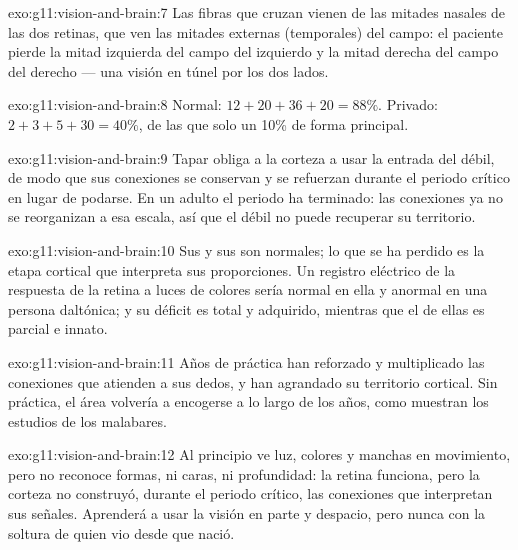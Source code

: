 \begin{solution}{exo:g11:vision-and-brain:7}
Las fibras que cruzan vienen de las mitades nasales de las dos retinas,
que ven las mitades externas (temporales) del campo: el paciente pierde
la mitad izquierda del campo del  izquierdo y la mitad derecha del
campo del  derecho --- una visión en túnel por los dos lados.
\end{solution}

\begin{solution}{exo:g11:vision-and-brain:8}
Normal: $12 + 20 + 36 + 20 = 88\%$. Privado: $2 + 3 + 5 + 30 = 40\%$,
de las que solo un 10\% de forma principal.
\end{solution}

\begin{solution}{exo:g11:vision-and-brain:9}
Tapar obliga a la corteza a usar la entrada del  débil, de modo que
sus conexiones se conservan y se refuerzan durante el periodo crítico
en lugar de podarse. En un adulto el periodo ha terminado: las
conexiones ya no se reorganizan a esa escala, así que el  débil no
puede recuperar su territorio.
\end{solution}

\begin{solution}{exo:g11:vision-and-brain:10}
Sus  y sus  son normales; lo que se ha perdido es la etapa
cortical que interpreta sus proporciones. Un registro eléctrico de la
respuesta de la retina a luces de colores sería normal en ella y
anormal en una persona daltónica; y su déficit es total y adquirido,
mientras que el de ellas es parcial e innato.
\end{solution}

\begin{solution}{exo:g11:vision-and-brain:11}
Años de práctica han reforzado y multiplicado las conexiones que
atienden a sus dedos, y han agrandado su territorio cortical. Sin
práctica, el área volvería a encogerse a lo largo de los años, como
muestran los estudios de los malabares.
\end{solution}

\begin{solution}{exo:g11:vision-and-brain:12}
Al principio ve luz, colores y manchas en movimiento, pero no reconoce
formas, ni caras, ni profundidad: la retina funciona, pero la corteza
no construyó, durante el periodo crítico, las conexiones que
interpretan sus señales. Aprenderá a usar la visión en parte y
despacio, pero nunca con la soltura de quien vio desde que nació.
\end{solution}

